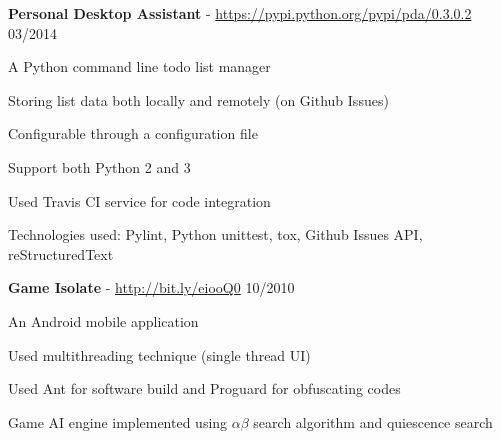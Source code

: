 \documentclass[margin,line]{resume}
\begin{document}
\begin{resume}
    \textbf{Personal Desktop Assistant} - \url{https://pypi.python.org/pypi/pda/0.3.0.2} \hfill 03/2014 \vspace{-3mm}\\\vspace{-1mm}%
      \begin{list2}
       \item A Python command line todo list manager
       \item Storing list data both locally and remotely (on Github Issues)
       \item Configurable through a configuration file
       \item Support both Python 2 and 3
       \item Used Travis CI service for code integration
       \item Technologies used: Pylint, Python unittest, tox, Github Issues API, reStructuredText
      \end{list2}

    \textbf{Game Isolate} - \url{http://bit.ly/eiooQ0} \hfill 10/2010 \vspace{-3mm}\\\vspace{-1mm}%
      \begin{list2}
       \item An Android mobile application
       \item Used multithreading technique (single thread UI)
       \item Used Ant for software build and Proguard for obfuscating codes
       \item Game AI engine implemented using $\alpha \beta$ search algorithm and quiescence search
      \end{list2}

\end{resume}
\end{document}
